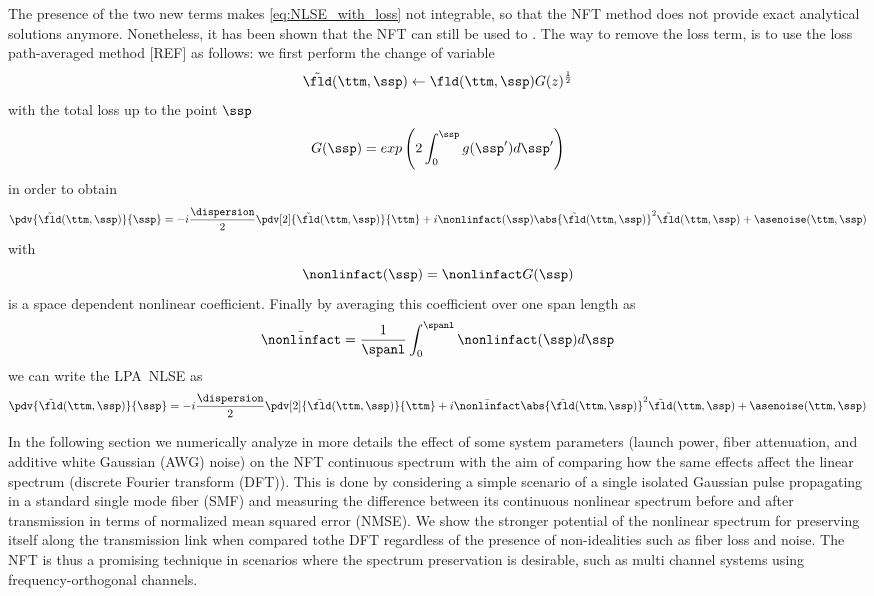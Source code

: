 The presence of the two new terms makes \eqref{eq:NLSE_with_loss} not
integrable, so that the NFT method does not provide exact analytical solutions
anymore. Nonetheless, it has been shown that the NFT can still be used to .
The way to remove the loss term, is to use the loss path-averaged method [REF]
as follows: we first perform the change of variable
\begin{equation}
  \tilde{\fld}(\ttm,\ssp) \leftarrow{} \fld(\ttm,\ssp)G(z)^{\frac{1}{2}}
\end{equation}
with the total loss up to the point $\ssp$
\begin{equation}
  G(\ssp) = exp\left(2\int_{0}^{\ssp} g(\ssp') d\ssp' \right)
\end{equation}
in order to obtain
\begin{equation}\label{eq:NLSE_with_loss_after_change_var}
\pdv{\tilde{\fld}(\ttm,\ssp)}{\ssp} =
-i \frac{\dispersion}{2} \pdv[2]{\tilde{\fld}(\ttm,\ssp)}{\ttm}
+ i\nonlinfact(\ssp) \abs{\tilde{\fld}(\ttm,\ssp)}^2 \tilde{\fld}(\ttm,\ssp)
+ \asenoise(\ttm,\ssp)
\end{equation}
with
\begin{equation}
 \nonlinfact(\ssp) = \nonlinfact G(\ssp)
\end{equation}
is a space dependent nonlinear coefficient.
Finally by averaging this coefficient over one span length as
\begin{equation}
  \bar{\nonlinfact} = \dfrac{1}{\spanl}\int_{0}^{\spanl} \nonlinfact(\ssp) d\ssp
\end{equation}
we can write the \ac{LPA}~\ac{NLSE} as
\begin{equation}\label{eq:NLSE_LPA}
  \pdv{\tilde{\fld} (\ttm,\ssp)}{\ssp} =
  -i \frac{\dispersion}{2} \pdv[2]{\tilde{\fld}(\ttm,\ssp)}{\ttm}
  + i\bar{\nonlinfact}\abs{\tilde{\fld}(\ttm,\ssp)}^2 \tilde{\fld}(\ttm,\ssp)
  + \asenoise(\ttm,\ssp)
\end{equation}


In the following section we numerically analyze in more details the effect of
some system parameters (launch power, fiber attenuation, and additive white
Gaussian (AWG) noise) on the \ac{NFT} continuous spectrum with the aim of
comparing how the same effects affect the linear spectrum (discrete Fourier
transform (DFT)). This is done by considering  a simple scenario of a single
isolated Gaussian pulse propagating in a standard single mode fiber (SMF) and
measuring the difference between its continuous nonlinear spectrum before and
after transmission in terms of normalized mean squared error (NMSE). We show
the stronger potential of the nonlinear spectrum for preserving itself along
the transmission link when compared tothe DFT regardless of the presence of
non-idealities such as fiber loss and noise.  The \ac{NFT} is thus a promising
technique in scenarios where the spectrum preservation is desirable, such as
multi channel systems using frequency-orthogonal channels.

